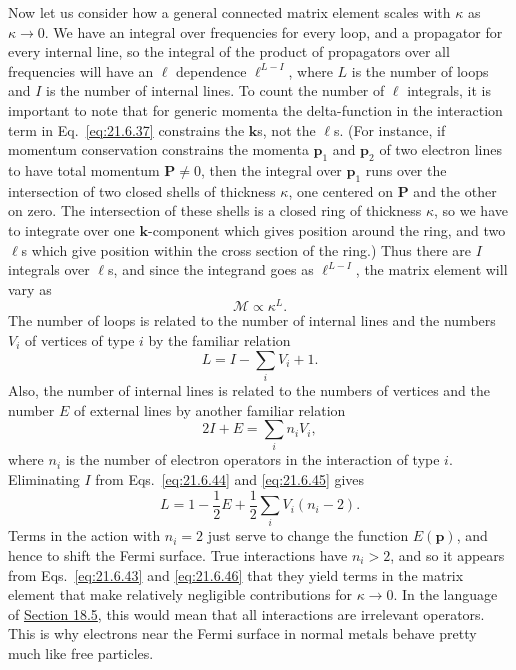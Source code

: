 Now let us consider how a general connected matrix element scales with $\kappa$ as $\kappa\to0$. We have an integral over frequencies for every loop, and a propagator for every internal line, so the integral of the product of propagators over all frequencies will have an $\ell$ dependence $\ell^{L-I}$, where $L$ is the number of loops and $I$ is the number of internal lines. To count the number of $\ell$ integrals, it is important to note that for generic momenta the delta-function in the interaction term in Eq.~\eqref{eq:21.6.37} constrains the $\mathbf k$s, not the $\ell$s. (For instance, if momentum conservation constrains the momenta $\mathbf p_1$ and $\mathbf p_2$ of two electron lines to have total momentum $\mathbf P\ne0$, then the integral over $\mathbf p_1$ runs over the intersection of two closed shells of thickness $\kappa$, one centered on $\mathbf P$ and the other on zero. The intersection of these shells is a closed ring of thickness $\kappa$, so we have to integrate over one $\mathbf k$-component which gives position around the ring, and two $\ell$s which give position within the cross section of the ring.) Thus there are $I$ integrals over $\ell$s, and since the integrand goes as $\ell^{L-I}$, the matrix element will vary as
\begin{equation}
\mathcal M\propto\kappa^L.
\tag{21.6.43}\label{eq:21.6.43}
\end{equation}
The number of loops is related to the number of internal lines and the numbers $V_i$ of vertices of type $i$ by the familiar relation
\begin{equation}
L=I-\sum_i V_i+1.
\tag{21.6.44}\label{eq:21.6.44}
\end{equation}
Also, the number of internal lines is related to the numbers of vertices and the number $E$ of external lines by another familiar relation
\begin{equation}
2I+E=\sum_i n_iV_i,
\tag{21.6.45}\label{eq:21.6.45}
\end{equation}
where $n_i$ is the number of electron operators in the interaction of type $i$. Eliminating $I$ from Eqs.~\eqref{eq:21.6.44} and \eqref{eq:21.6.45} gives
\begin{equation}
L=1-\frac12E+\frac12\sum_i V_i(n_i-2).
\tag{21.6.46}\label{eq:21.6.46}
\end{equation}
Terms in the action with $n_i=2$ just serve to change the function $E(\mathbf p)$, and hence to shift the Fermi surface. True interactions have $n_i>2$, and so it appears from Eqs.~\eqref{eq:21.6.43} and \eqref{eq:21.6.46} that they yield terms in the matrix element that make relatively negligible contributions for $\kappa\to0$. In the language of \hyperref[sec:18.5]{Section 18.5}, this would mean that all interactions are irrelevant operators. This is why electrons near the Fermi surface in normal metals behave pretty much like free particles.

